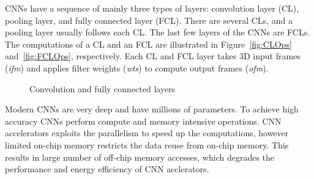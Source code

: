 \documentclass[a4paper,10pt]{article}
\begin{document}
CNNs have a sequence of mainly three types of layers: convolution layer (CL), pooling layer, and fully connected layer (FCL). There are several CLs, and a pooling layer usually follows each CL. The last few layers of the CNNs are FCLs. The computations of a CL and an FCL are illustrated in Figure~\ref{fig:CLOps} and~\ref{fig:FCLOps}, respectively. Each CL and FCL layer takes 3D input frames (\textit{ifm}) and applies filter weights (\textit{wts}) to compute output frames (\textit{ofm}).
\begin{figure}[!htb]
	\centering
	\hfil	
	\hfil	
	\caption{Convolution and fully connected layers}
	\label{fig:CNNAcceleratorAndCLOps}
	\vspace{-1.0em}	
\end{figure}
Modern CNNs are very deep and have millions of parameters. To achieve high accuracy CNNs perform compute and memory intensive operations.  CNN accelerators exploits the parallelism to speed up the computations, however limited on-chip memory restricts the data reuse from on-chip memory. This results in large number of off-chip memory accesses, which degrades the performance and energy efficiency of CNN acclerators. 
\end{document}

